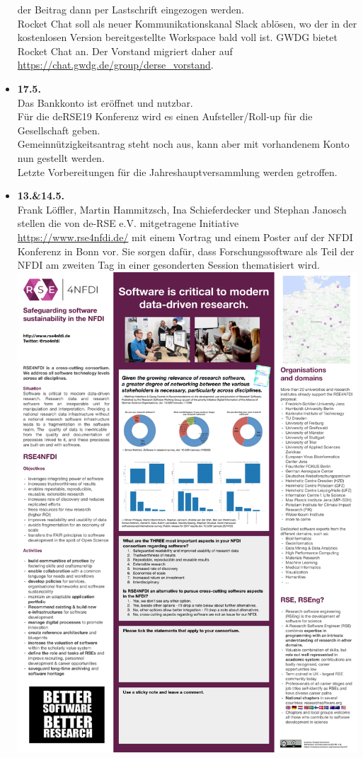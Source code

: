 \begin{itemize}
  der Beitrag dann per Lastschrift eingezogen werden.\\
  Rocket Chat soll als neuer Kommunikationskanal Slack ablösen, wo der in
  der kostenlosen Version bereitgestellte Workspace bald voll ist. GWDG
  bietet Rocket Chat an. Der Vorstand migriert daher auf\\
  \href{https://chat.gwdg.de/group/derse_vorstand}{https://chat.gwdg.de/group/derse\_vorstand}.
 \item \textbf{17.5.}\\
  Das Bankkonto ist eröffnet und nutzbar.\\
  Für die deRSE19 Konferenz wird es einen Aufsteller/Roll-up für die Gesellschaft geben.\\
  Gemeinnützigkeitsantrag steht noch aus, kann aber mit vorhandenem Konto nun gestellt werden.\\
  Letzte Vorbereitungen für die Jahreshauptversammlung werden getroffen.
 \item \textbf{13.\&14.5.}\\
  Frank Löffler, Martin Hammitzsch, Ina Schieferdecker und Stephan Janosch stellen die von de-RSE e.V. mitgetragene Initiative\\\href{RSE4NFDI}{https://www.rse4nfdi.de/} mit einem Vortrag und einem Poster auf der NFDI Konferenz in Bonn vor. Sie sorgen dafür, dass Forschungssoftware als Teil der NFDI am zweiten Tag in einer gesonderten Session thematisiert wird.\\
  \includegraphics[width=\textwidth]{RSE4NFDI_Poster}\\

\end{itemize}
